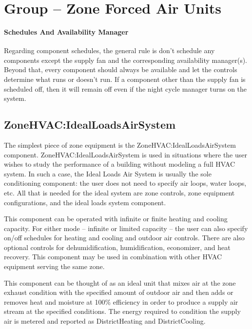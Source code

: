 \section{Group -- Zone Forced Air Units}\label{group-zone-forced-air-units}

\paragraph{Schedules And Availability Manager}\label{schedules-and-availability-manager}
Regarding component schedules, the general rule is don't schedule any components except the supply fan and the corresponding availability manager(s). Beyond that, every component should always be available and let the controls determine what runs or doesn't run. If a component other than the supply fan is scheduled off, then it will remain off even if the night cycle manager turns on the system.

\subsection{ZoneHVAC:IdealLoadsAirSystem}\label{zonehvacidealloadsairsystem}

The simplest piece of zone equipment is the ZoneHVAC:IdealLoadsAirSystem component. ZoneHVAC:IdealLoadsAirSystem is used in situations where the user wishes to study the performance of a building without modeling a full HVAC system. In such a case, the Ideal Loads Air System is usually the sole conditioning component: the user does not need to specify air loops, water loops, etc. All that is needed for the ideal system are zone controls, zone equipment configurations, and the ideal loads system component.

This component can be operated with infinite or finite heating and cooling capacity. For either mode -- infinite or limited capacity -- the user can also specify on/off schedules for heating and cooling and outdoor air controls. There are also optional controls for dehumidification, humidification, economizer, and heat recovery. This component may be used in combination with other HVAC equipment serving the same zone.

This component can be thought of as an ideal unit that mixes air at the zone exhaust condition with the specified amount of outdoor air and then adds or removes heat and moisture at 100\% efficiency in order to produce a supply air stream at the specified conditions. The energy required to condition the supply air is metered and reported as DistrictHeating and DistrictCooling.


